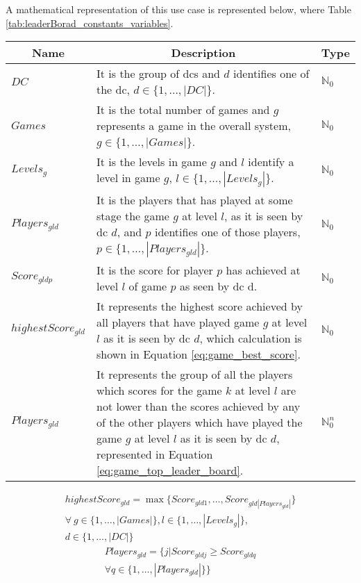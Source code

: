 A mathematical representation of this use case is represented below, where Table \ref{tab:leaderBorad_constants_variables}.
\begin{table*}[!ht]
	\begin{tabular}{|p{2.2cm}|p{13.5cm}|p{.8cm}| }
		\hline
		\multicolumn{1}{|c|}{Name} & \multicolumn{1}{c|}{Description} & \multicolumn{1}{c|}{Type} \\
		\hline
		\hline
			$DC$ & It is the group of \glspl{dc} and $d$ identifies one of the \gls{dc}, $d \in \{1,\dots, |DC|\}$. & $\mathbb{N}_{0}$ \\
		\hline
			$Games$ & It is the total number of games and $g$ represents a game in the overall system, $g \in \{1,\dots, |Games|\}$. & $\mathbb{N}_{0}$ \\
		\hline
			$Levels_{g}$ & It is the levels in game $g$ and $l$ identify a level in game $g$, $l \in \{1,..., |Levels_{g}|\}$. & $\mathbb{N}_{0}$ \\
		\hline
			$Players_{gld}$ & It is the players that has played at some stage the game $g$ at level $l$, as it is seen by \gls{dc} $d$, and $p$ identifies one of those players, $p \in \{1,\dots, |Players_{gld}|\}$. & $\mathbb{N}_{0}$ \\
		\hline
			$Score_{gldp}$ & It is the score for player $p$ has achieved at level $l$ of game $p$ as seen by \gls{dc} d. & $\mathbb{N}_{0}$ \\
		\hline
			$highestScore_{gld}$ & It represents the highest score achieved by all players that have played game $g$ at level $l$ as it is seen by \gls{dc} $d$, which calculation is shown in Equation \ref{eq:game_best_score}. & $\mathbb{N}_{0}$ \\
		\hline
			$Players_{gld}$ & It represents the group of all the players which scores for the game $k$ at level $l$ are not lower than the scores achieved by any of the other players which have played the game $g$ at level $l$ as it is seen by \gls{dc} $d$, represented in Equation \ref{eq:game_top_leader_board}. & $\mathbb{N}^{n}_{0}$ \\
		\hline
	\end{tabular}
			
	\caption{Leader Board Constants and Variables.}
	\label{tab:leaderBorad_constants_variables}
\end{table*}
\begin{multline} \label{eq:game_best_score}
	highestScore_{gld} = \max\{Score_{gld1},\dots, Score_{gld|Players_{gld}|}\}\\ \forall ~ g \in \{1,\dots, |Games|\}, l \in \{1,\dots, |Levels_{g}|\},\\ d \in \{1,\dots, |DC|\}
\end{multline}
\begin{multline} \label{eq:game_top_leader_board}
	Players_{gld} = \{j | Score_{gldj} \ge Score_{gldq}\\ \forall q \in \{1,\dots, |Players_{gld}|\}\}
\end{multline}

